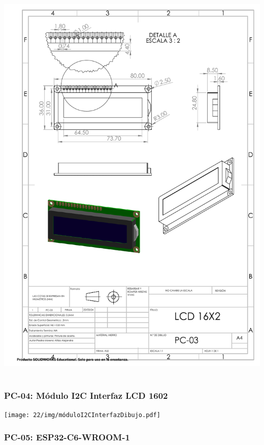\begin{center}
\includegraphics[width=.85\textwidth]{22/img/lcdDibujo.PDF}~\\[15cm]
\end{center}

\subsubsection{PC-04: Módulo I2C Interfaz LCD 1602 }

\begin{center}
\texttt{[image: 22/img/móduloI2CInterfazDibujo.pdf]}~\\[15cm]
\end{center}

\subsubsection{PC-05: ESP32-C6-WROOM-1 }

